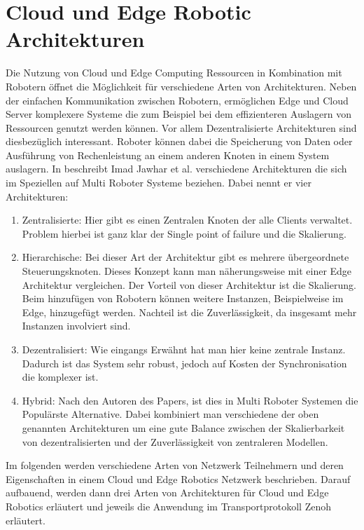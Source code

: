 \section{Cloud und Edge Robotic Architekturen} %
\label{sec:Cloud und Edge Robotic Architekturen}

Die Nutzung von Cloud und Edge Computing Ressourcen in Kombination mit Robotern öffnet die Möglichkeit für verschiedene Arten von Architekturen. Neben der einfachen Kommunikation zwischen Robotern, ermöglichen Edge und Cloud Server komplexere Systeme die zum Beispiel bei dem effizienteren Auslagern von Ressourcen genutzt werden können. Vor allem Dezentralisierte Architekturen sind diesbezüglich interessant. Roboter können dabei die Speicherung von Daten oder Ausführung von Rechenleistung an einem anderen Knoten in einem System auslagern. In \cite{jawharNetworkingMultiRobotSystems2018} beschreibt Imad Jawhar et al. verschiedene Architekturen die sich im Speziellen auf Multi Roboter Systeme beziehen. Dabei nennt er vier Architekturen:

\begin{enumerate}
  \item Zentralisierte: Hier gibt es einen Zentralen Knoten der alle Clients verwaltet. Problem hierbei ist ganz klar der Single point of failure und die Skalierung.
    \item Hierarchische: Bei dieser Art der Architektur gibt es mehrere übergeordnete Steuerungsknoten. Dieses Konzept kann man näherungsweise mit einer Edge Architektur vergleichen. Der Vorteil von dieser Architektur ist die Skalierung. Beim hinzufügen von Robotern können weitere Instanzen, Beispielweise im Edge, hinzugefügt werden. Nachteil ist die Zuverlässigkeit, da insgesamt mehr Instanzen involviert sind.
      \item Dezentralisiert: Wie eingangs Erwähnt hat man hier keine zentrale Instanz. Dadurch ist das System sehr robust, jedoch auf Kosten der Synchronisation die komplexer ist.
        \item Hybrid: Nach den Autoren des Papers, ist dies in Multi Roboter Systemen die Populärste Alternative. Dabei kombiniert man verschiedene der oben genannten Architekturen um eine gute Balance zwischen der Skalierbarkeit von dezentralisierten und der Zuverlässigkeit von zentraleren Modellen.
\end{enumerate}

Im folgenden werden verschiedene Arten von Netzwerk Teilnehmern und deren Eigenschaften in einem Cloud und Edge Robotics Netzwerk beschrieben. Darauf aufbauend, werden dann drei Arten von Architekturen für Cloud und Edge Robotics erläutert und jeweils die Anwendung im Transportprotokoll Zenoh erläutert.\\


